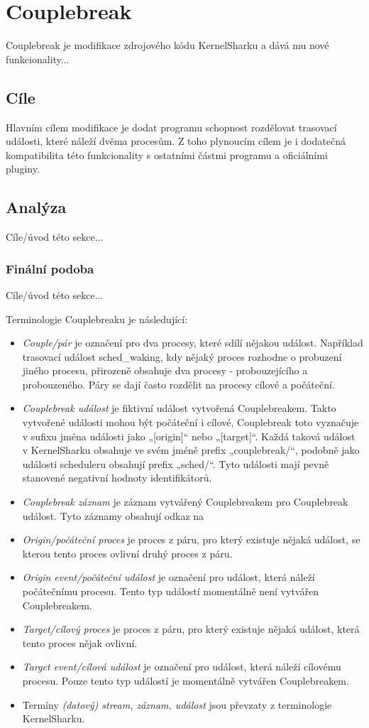 \chapter{Couplebreak}
Couplebreak je modifikace zdrojového kódu KernelSharku a dává mu nové funkcionality...

\section{Cíle}
Hlavním cílem modifikace je dodat programu schopnost rozdělovat trasovací události, které náleží dvěma procesům. Z toho plynoucím cílem je i dodatečná kompatibilita této funkcionality s ostatními částmi programu a oficiálními pluginy.

\section{Analýza}
Cíle/úvod této sekce...


\subsection*{Finální podoba}
Cíle/úvod této sekce...

Terminologie Couplebreaku je následující:
\begin{itemize}
    \item \emph{Couple/pár} je označení pro dva procesy, které sdílí nějakou událost. Například trasovací událost sched\_waking, kdy nějaký proces rozhodne o probuzení jiného procesu, přirozeně obsahuje dva procesy - probouzejícího a probouzeného. Páry se dají často rozdělit na procesy cílové a počáteční.
    \item \emph{Couplebreak událost} je fiktivní událost vytvořená Couplebreakem. Takto vytvořené události mohou být počáteční i cílové, Couplebreak toto vyznačuje v sufixu jména události jako „[origin]“ nebo „[target]“. Každá taková událost v KernelSharku obsahuje ve svém jméně prefix „couplebreak/“, podobně jako události scheduleru obsahují prefix „sched/“. Tyto události mají pevně stanovené negativní hodnoty identifikátorů.
    \item \emph{Couplebreak záznam} je záznam vytvářený Couplebreakem pro Couplebreak událost. Tyto záznamy obsahují odkaz na 
    \item \emph{Origin/počáteční proces} je proces z páru, pro který existuje nějaká událost, se kterou tento proces ovlivní druhý proces z páru.
    \item \emph{Origin event/počáteční událost} je označení pro událost, která náleží počátečnímu procesu. Tento typ událostí momentálně není vytvářen Couplebreakem.
    \item \emph{Target/cílový proces} je proces z páru, pro který existuje nějaká událost, která tento proces nějak ovlivní. 
    \item \emph{Target event/cílová událost} je označení pro událost, která náleží cílovému procesu. Pouze tento typ událostí je momentálně vytvářen Couplebreakem.
    \item Termíny \emph{(datový) stream, záznam, událost} jsou převzaty z terminologie KernelSharku.
\end{itemize}

